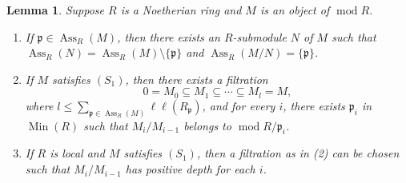 \documentclass[11pt]{amsart}
\theoremstyle{plain}
\newtheorem{lemma}[theorem]{Lemma}
\theoremstyle{definition}
\numberwithin{equation}{section}
\numberwithin{theorem}{section}
\begin{document}
\begin{lemma}\label{lem:bounds_via_min_primes}
    Suppose $R$ is a Noetherian ring and $M$ is an object of $\operatorname{mod}R$.
    \begin{enumerate}
        \item If $\mathfrak{p}\in \operatorname{Ass}_R(M)$, then there exists an $R$-submodule $N$ of $M$ such that $\operatorname{Ass}_R(N)=\operatorname{Ass}_R(M)\setminus \{\mathfrak p\}$ and $\operatorname{Ass}_R(M/N)=\{\mathfrak p\}$.  
        
        


        
        \item If $M$ satisfies $(S_1)$, then there exists a filtration 
        \begin{displaymath}
            0=M_0\subseteq M_1\subseteq \cdots \subseteq M_l=M,
        \end{displaymath}
        where $l\leq \sum_{\mathfrak{p}\in \operatorname{Ass}_R(M)} \ell\ell(R_{\mathfrak{p}})$, and for every $i$, there exists $\mathfrak{p}_i$ in $\operatorname{Min}(R)$ such that $M_i/M_{i-1}$ belongs to $\operatorname{mod}R/\mathfrak{p}_i$.  
        \item If $R$ is local and $M$ satisfies $(S_1)$, then a filtration as in (2) can be chosen such that $M_i/M_{i-1}$ has positive depth for each $i$.
    \end{enumerate}  
\end{lemma}
\end{document}
